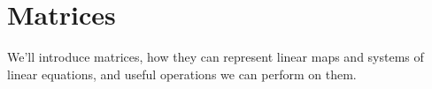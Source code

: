 \chapter{Matrices}

We'll introduce matrices, how they can represent linear maps and systems of linear equations, and useful operations we can perform on them.





